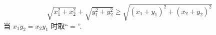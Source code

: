 
\begin{equation}\label{test2_eq1}
\sqrt{x_1^2 + x_2^2} + \sqrt{y_1^2 + y_2^2} \geqslant \sqrt{(x_1+y_1)^2 + (x_2+y_2)^2}
\end{equation}
当 $x_1 y_2 = x_2 y_1$ 时取“$=$”.
